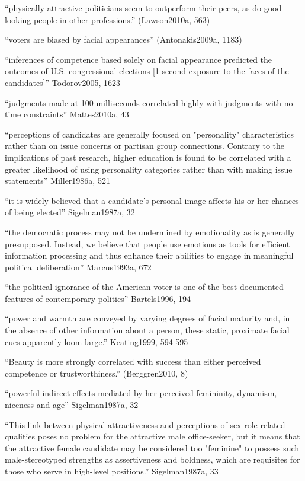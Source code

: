 ``physically attractive politicians seem to outperform their peers, as do good-looking people in other professions.'' (Lawson2010a, 563)

``voters are biased by facial appearances'' (Antonakis2009a, 1183)


	
	``inferences of competence based solely on facial appearance predicted the outcomes of U.S. congressional elections [1-second exposure to the faces of the candidates]'' Todorov2005, 1623

	``judgments made at 100 milliseconds correlated highly with judgments with no time constraints'' Mattes2010a, 43

``perceptions of candidates are generally focused on "personality" characteristics rather than on issue concerns or partisan group connections. Contrary to the implications of past research, higher education is found to be correlated with a greater likelihood of using personality categories rather than with making issue statements'' Miller1986a, 521

``it is widely believed that a candidate's personal image affects his or her chances of being elected'' Sigelman1987a, 32

``the democratic process may not be undermined by emotionality as is generally presupposed. Instead, we believe that people use emotions as tools for efficient information processing and thus enhance their abilities to engage in meaningful political deliberation'' Marcus1993a, 672

``the political ignorance of the American voter is one of the best-documented features of contemporary politics'' Bartels1996, 194

``power and warmth are conveyed by varying degrees of facial maturity and, in the absence of other information about a person, these static, proximate facial cues apparently loom large.'' Keating1999, 594-595

``Beauty is more strongly correlated with success than either perceived competence or trustworthiness.'' (Berggren2010, 8)



``powerful indirect effects mediated by her perceived femininity, dynamism, niceness and age'' Sigelman1987a, 32

``This link between physical attractiveness and perceptions of sex-role related qualities poses no problem for the attractive male office-seeker, but it means that the attractive female candidate may be considered too "feminine" to possess such male-stereotyped strengths as assertiveness and boldness, which are requisites for those who serve in high-level positions.''  Sigelman1987a, 33

